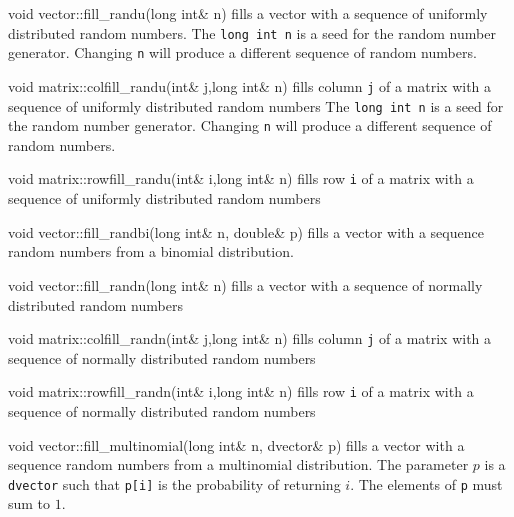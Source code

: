 \documentclass[12pt]{book}
\begin{document}
  
\beginexample
void vector::fill_randu(long int& n)
\endexample
\noindent fills a vector with a sequence of uniformly distributed 
random numbers. The {\tt long int n} is a seed for the random number
generator. Changing {\tt n} will produce a different sequence of
random numbers.

\beginexample
void matrix::colfill_randu(int& j,long int& n)
\endexample
\noindent fills column {\tt j} of a matrix with a sequence of uniformly 
distributed random numbers
The {\tt long int n} is a seed for the random number
generator. Changing {\tt n} will produce a different sequence of
random numbers.

\beginexample
void matrix::rowfill_randu(int& i,long int& n)
\endexample
\noindent fills row {\tt i} of a matrix with a sequence of uniformly 
distributed random numbers

  
\beginexample
void vector::fill_randbi(long int& n, double& p)
\endexample
\noindent fills a vector with a sequence random numbers from
a binomial distribution.

  
\beginexample
void vector::fill_randn(long int& n)
\endexample
\noindent fills a vector with a sequence of normally distributed 
random numbers

\beginexample
void matrix::colfill_randn(int& j,long int& n)
\endexample
\noindent fills column {\tt j} of a matrix with a sequence of normally 
distributed random numbers

\beginexample
void matrix::rowfill_randn(int& i,long int& n)
\endexample
\noindent fills row {\tt i} of a matrix with a sequence of normally 
distributed random numbers

  
\beginexample
void vector::fill_multinomial(long int& n, dvector& p)
\endexample
\noindent fills a vector with a sequence random numbers from
a multinomial distribution. The parameter $p$ is a {\tt dvector} such that
{\tt p[i]} is the probability of returning $i$. The elements of {\tt p}
must sum to $1$.
\end{document}
